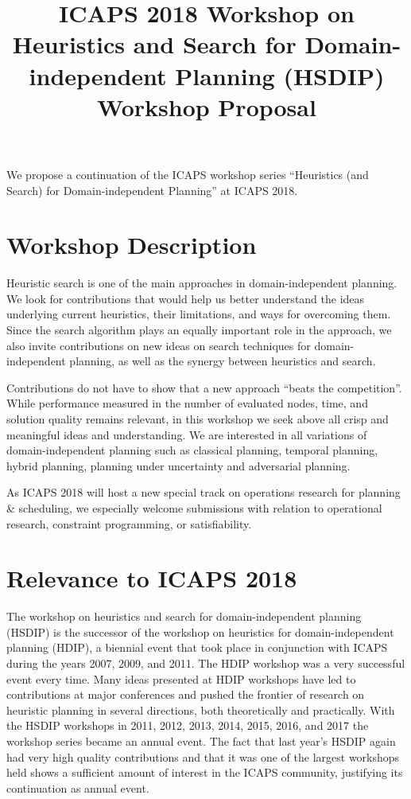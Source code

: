 \documentclass[10pt]{article}
\begin{document}
\title{ICAPS 2018 Workshop on \\ Heuristics and Search for Domain-independent
Planning (HSDIP)\\ \vspace*{0.7cm} Workshop Proposal
}
\date{}

\author{}

\maketitle


We propose a continuation of the ICAPS workshop series ``Heuristics
(and Search) for Domain-independent Planning'' at ICAPS 2018.

\section*{Workshop Description}
Heuristic search is one of the main approaches in domain-independent
planning.  We look for contributions that would help us better
understand the ideas underlying current heuristics, their limitations,
and ways for overcoming them.
%
Since the search algorithm plays an equally important role in the
approach, we also invite contributions on new ideas on search
techniques for domain-independent planning, as well as the synergy
between heuristics and search.

Contributions do not have to show that a new approach ``beats the competition''.
While performance measured in the number of evaluated nodes, time, and solution
quality remains relevant, in this workshop we seek above all crisp and
meaningful ideas and understanding.
%
We are interested in all variations of domain-independent planning
such as classical planning, temporal planning, hybrid planning, planning under
uncertainty and adversarial planning.

As ICAPS 2018 will host a new special track on operations research for planning
\& scheduling, we especially welcome submissions with relation to operational
research, constraint programming, or satisfiability.


\section*{Relevance to ICAPS 2018}

The workshop on heuristics and search for domain-independent planning
(HSDIP) is the successor of the workshop on heuristics for
domain-independent planning (HDIP), a biennial event that took place
in conjunction with ICAPS during the years 2007, 2009, and 2011. The
HDIP workshop was a very successful event every time. Many ideas
presented at HDIP workshops have led to contributions at major
conferences and pushed the frontier of research on heuristic planning
in several directions, both theoretically and practically.
%
With the HSDIP workshops in 2011, 2012, 2013, 2014, 2015, 2016, and 2017 the
workshop series became an annual event. The fact that last year's HSDIP again had very
high quality contributions and that it was one of the largest workshops held
shows a sufficient amount of interest in the ICAPS community, justifying its
continuation as annual event.
\end{document}
